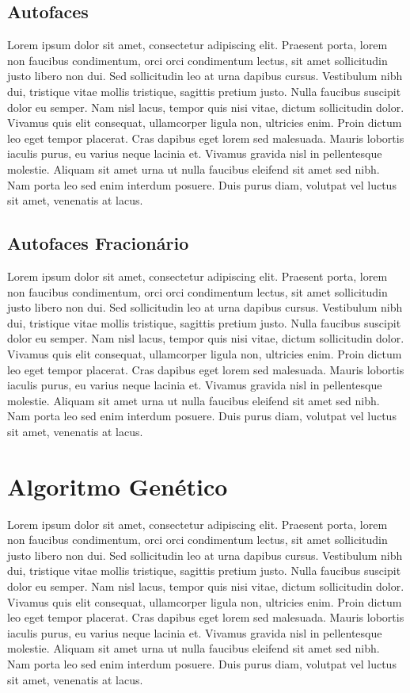 \documentclass[12pt]{article}
\begin{document}
\subsection{Autofaces}

Lorem ipsum dolor sit amet, consectetur adipiscing elit. Praesent porta, lorem non faucibus condimentum, orci orci condimentum lectus, sit amet sollicitudin justo libero non dui. Sed sollicitudin leo at urna dapibus cursus. Vestibulum nibh dui, tristique vitae mollis tristique, sagittis pretium justo. Nulla faucibus suscipit dolor eu semper. Nam nisl lacus, tempor quis nisi vitae, dictum sollicitudin dolor. Vivamus quis elit consequat, ullamcorper ligula non, ultricies enim. Proin dictum leo eget tempor placerat. Cras dapibus eget lorem sed malesuada. Mauris lobortis iaculis purus, eu varius neque lacinia et. Vivamus gravida nisl in pellentesque molestie. Aliquam sit amet urna ut nulla faucibus eleifend sit amet sed nibh. Nam porta leo sed enim interdum posuere. Duis purus diam, volutpat vel luctus sit amet, venenatis at lacus. 

\subsection{Autofaces Fracionário}

Lorem ipsum dolor sit amet, consectetur adipiscing elit. Praesent porta, lorem non faucibus condimentum, orci orci condimentum lectus, sit amet sollicitudin justo libero non dui. Sed sollicitudin leo at urna dapibus cursus. Vestibulum nibh dui, tristique vitae mollis tristique, sagittis pretium justo. Nulla faucibus suscipit dolor eu semper. Nam nisl lacus, tempor quis nisi vitae, dictum sollicitudin dolor. Vivamus quis elit consequat, ullamcorper ligula non, ultricies enim. Proin dictum leo eget tempor placerat. Cras dapibus eget lorem sed malesuada. Mauris lobortis iaculis purus, eu varius neque lacinia et. Vivamus gravida nisl in pellentesque molestie. Aliquam sit amet urna ut nulla faucibus eleifend sit amet sed nibh. Nam porta leo sed enim interdum posuere. Duis purus diam, volutpat vel luctus sit amet, venenatis at lacus.

\section{Algoritmo Genético}

Lorem ipsum dolor sit amet, consectetur adipiscing elit. Praesent porta, lorem non faucibus condimentum, orci orci condimentum lectus, sit amet sollicitudin justo libero non dui. Sed sollicitudin leo at urna dapibus cursus. Vestibulum nibh dui, tristique vitae mollis tristique, sagittis pretium justo. Nulla faucibus suscipit dolor eu semper. Nam nisl lacus, tempor quis nisi vitae, dictum sollicitudin dolor. Vivamus quis elit consequat, ullamcorper ligula non, ultricies enim. Proin dictum leo eget tempor placerat. Cras dapibus eget lorem sed malesuada. Mauris lobortis iaculis purus, eu varius neque lacinia et. Vivamus gravida nisl in pellentesque molestie. Aliquam sit amet urna ut nulla faucibus eleifend sit amet sed nibh. Nam porta leo sed enim interdum posuere. Duis purus diam, volutpat vel luctus sit amet, venenatis at lacus.  
\end{document}
